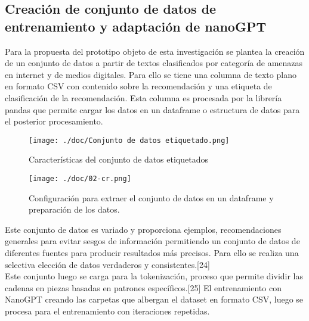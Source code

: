 
\subsection{Creación de conjunto de datos de entrenamiento y adaptación de nanoGPT}\label{section:Creación de conjunto de datos con fuentes de internet} 
Para la propuesta del prototipo objeto de esta investigación se plantea la creación de un conjunto de datos a partir de textos clasificados por categoría de amenazas en internet y de medios digitales. Para ello se tiene una columna de texto plano en formato CSV con contenido sobre la recomendación y una etiqueta de clasificación de la recomendación. Esta columna es procesada por la librería pandas que permite cargar los datos en un dataframe o estructura de datos para el posterior procesamiento.\cite{Reiss2021} \\

\begin{figure}[H]
   \centering %
       \texttt{[image: ./doc/Conjunto de datos etiquetado.png]} 
   \caption{Características del conjunto de datos etiquetados \cite{}}
  \label{figure:Conjunto de datos}  %
\end{figure}
\begin{figure}[H]
   \centering %
       \texttt{[image: ./doc/02-cr.png]} 
   \caption{Configuración para extraer el conjunto de datos en un dataframe y preparación de los datos.  \cite{}}
  \label{figure:Extraxión de datos del csv}  %
\end{figure}

Este conjunto de datos es variado y proporciona ejemplos, recomendaciones generales para evitar sesgos de información permitiendo un conjunto de datos de diferentes fuentes para producir resultados más precisos. Para ello se realiza una selectiva elección de datos verdaderos y consistentes.[24] \\
Este conjunto luego se carga para la tokenización, proceso que permite dividir las cadenas en piezas basadas en patrones específicos.[25] El entrenamiento con NanoGPT creando las carpetas que albergan el dataset en formato CSV, luego se procesa para el entrenamiento con iteraciones repetidas. \\


